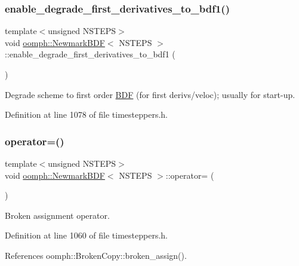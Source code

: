\subsubsection{\texorpdfstring{enable\+\_\+degrade\+\_\+first\+\_\+derivatives\+\_\+to\+\_\+bdf1()}{enable\_degrade\_first\_derivatives\_to\_bdf1()}}
{\footnotesize\ttfamily template$<$unsigned N\+S\+T\+E\+PS$>$ \\
void \hyperlink{classoomph_1_1NewmarkBDF}{oomph\+::\+Newmark\+B\+DF}$<$ N\+S\+T\+E\+PS $>$\+::enable\+\_\+degrade\+\_\+first\+\_\+derivatives\+\_\+to\+\_\+bdf1 (\begin{DoxyParamCaption}{ }\end{DoxyParamCaption})\hspace{0.3cm}{\ttfamily [inline]}}



Degrade scheme to first order \hyperlink{classoomph_1_1BDF}{B\+DF} (for first derivs/veloc); usually for start-\/up. 



Definition at line 1078 of file timesteppers.\+h.

\mbox{\label{classoomph_1_1NewmarkBDF_a94d898ccf3bcae3987009d72c26e7496}} 
\subsubsection{\texorpdfstring{operator=()}{operator=()}}
{\footnotesize\ttfamily template$<$unsigned N\+S\+T\+E\+PS$>$ \\
void \hyperlink{classoomph_1_1NewmarkBDF}{oomph\+::\+Newmark\+B\+DF}$<$ N\+S\+T\+E\+PS $>$\+::operator= (\begin{DoxyParamCaption}\item[{const \hyperlink{classoomph_1_1NewmarkBDF}{Newmark\+B\+DF}$<$ N\+S\+T\+E\+PS $>$ \&}]{ }\end{DoxyParamCaption})\hspace{0.3cm}{\ttfamily [inline]}}



Broken assignment operator. 



Definition at line 1060 of file timesteppers.\+h.



References oomph\+::\+Broken\+Copy\+::broken\+\_\+assign().


